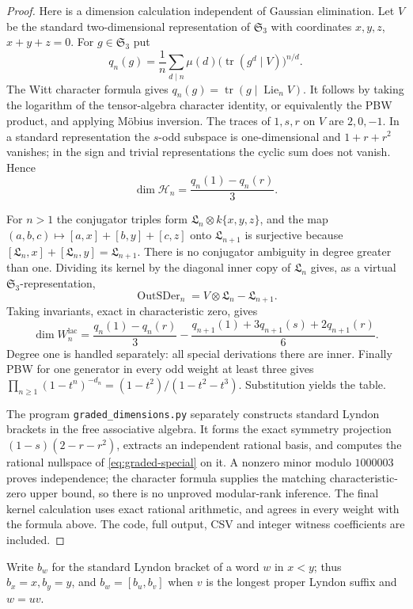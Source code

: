 \begin{proof}
Here is a dimension calculation independent of Gaussian elimination.
Let $V$ be the standard two-dimensional representation of
$\mathfrak S_3$ with coordinates $x,y,z$, $x+y+z=0$.
For $g\in\mathfrak S_3$ put
\[
 q_n(g)=\frac1n\sum_{d\mid n}\mu(d)
        \bigl(\operatorname{tr}(g^d\mid V)\bigr)^{n/d}.
\]
The Witt character formula gives
$q_n(g)=\operatorname{tr}(g\mid\operatorname{Lie}_nV)$.
It follows by taking the logarithm of the tensor-algebra character
identity, or equivalently the PBW product, and applying M\"obius
inversion.  The traces of $1,s,r$ on $V$ are $2,0,-1$.
In a standard representation the $s$-odd subspace is one-dimensional
and $1+r+r^2$ vanishes; in the sign and trivial representations the
cyclic sum does not vanish.  Hence
\[
 \dim\mathcal H_n=\frac{q_n(1)-q_n(r)}3.
\]

For $n>1$ the conjugator triples form
$\mathfrak L_n\otimes k\{x,y,z\}$, and the map
$(a,b,c)\mapsto[a,x]+[b,y]+[c,z]$ onto $\mathfrak L_{n+1}$ is
surjective because $[\mathfrak L_n,x]+[\mathfrak L_n,y]
=\mathfrak L_{n+1}$.
There is no conjugator ambiguity in degree greater than one.
Dividing its kernel by the diagonal inner copy of $\mathfrak L_n$
gives, as a virtual $\mathfrak S_3$-representation,
\[
 \operatorname{OutSDer}_n=V\otimes\mathfrak L_n-\mathfrak L_{n+1}.
\]
Taking invariants, exact in characteristic zero, gives
\[
 \dim W^{\mathrm{lac}}_n
 =\frac{q_n(1)-q_n(r)}3
 -\frac{q_{n+1}(1)+3q_{n+1}(s)+2q_{n+1}(r)}6.
\]
Degree one is handled separately: all special derivations there are
inner.  Finally PBW for one generator in every odd weight at least
three gives
$\prod_{n\geq1}(1-t^n)^{-d_n}=(1-t^2)/(1-t^2-t^3)$.
Substitution yields the table.

The program \texttt{graded\_dimensions.py} separately constructs
standard Lyndon brackets in the free associative algebra.  It forms
the exact symmetry projection
$(1-s)(2-r-r^2)$, extracts an independent rational basis, and computes
the rational nullspace of \eqref{eq:graded-special} on it.
A nonzero minor modulo $1000003$ proves independence; the character
formula supplies the matching characteristic-zero upper bound, so
there is no unproved modular-rank inference.  The final kernel
calculation uses exact rational arithmetic, and agrees in every weight
with the formula above.  The code, full output, CSV and integer witness
coefficients are included.
\end{proof}

Write $b_w$ for the standard Lyndon bracket of a word $w$ in $x<y$;
thus $b_x=x,b_y=y$, and $b_w=[b_u,b_v]$ when $v$ is the longest
proper Lyndon suffix and $w=uv$.

